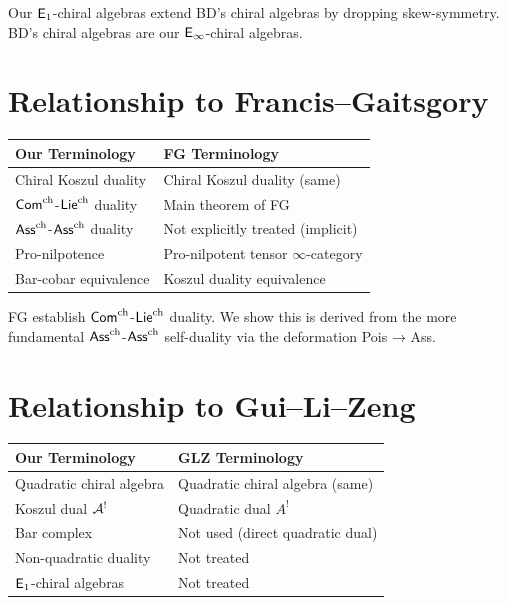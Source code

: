 \begin{remark}
Our $\mathsf{E}_1$-chiral algebras extend BD's chiral algebras by dropping skew-symmetry. BD's chiral algebras are our $\mathsf{E}_{\infty}$-chiral algebras.
\end{remark}

\section{Relationship to Francis--Gaitsgory}

\begin{tabular}{>{\raggedright\arraybackslash}p{}>{\raggedright\arraybackslash}p{}}
\textbf{Our Terminology} & \textbf{FG Terminology} \\
\hline
Chiral Koszul duality & Chiral Koszul duality (same) \\
$\mathsf{Com}^{\mathrm{ch}}$-$\mathsf{Lie}^{\mathrm{ch}}$ duality & Main theorem of FG \\
$\mathsf{Ass}^{\mathrm{ch}}$-$\mathsf{Ass}^{\mathrm{ch}}$ duality & Not explicitly treated (implicit) \\
Pro-nilpotence & Pro-nilpotent tensor $\infty$-category \\
Bar-cobar equivalence & Koszul duality equivalence \\
\end{tabular}

\begin{remark}
FG establish $\mathsf{Com}^{\mathrm{ch}}$-$\mathsf{Lie}^{\mathrm{ch}}$ duality. We show this is derived from the more fundamental $\mathsf{Ass}^{\mathrm{ch}}$-$\mathsf{Ass}^{\mathrm{ch}}$ self-duality via the deformation Pois → Ass.
\end{remark}

\section{Relationship to Gui--Li--Zeng}

\begin{tabular}{>{\raggedright\arraybackslash}p{}>{\raggedright\arraybackslash}p{}}
\textbf{Our Terminology} & \textbf{GLZ Terminology} \\
\hline
Quadratic chiral algebra & Quadratic chiral algebra (same) \\
Koszul dual $\mathcal{A}^!$ & Quadratic dual $A^!$ \\
Bar complex & Not used (direct quadratic dual) \\
Non-quadratic duality & Not treated \\
$\mathsf{E}_1$-chiral algebras & Not treated \\
\end{tabular}

